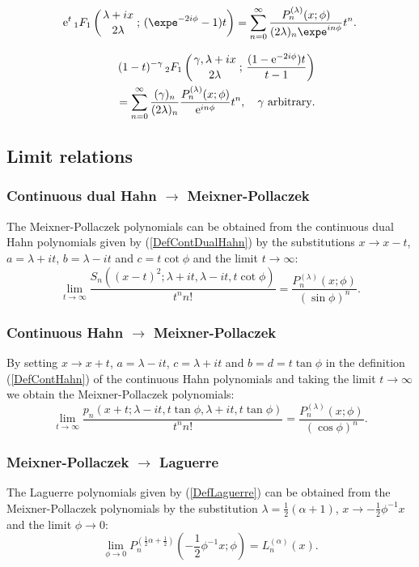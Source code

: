 \documentclass[envcountchap,graybox]{svmono}
\newcounter{rom}
\newcommand{\hyp}[5]{\mbox{}_{#1}{F}_{#2}
\left(\genfrac{}{}{0pt}{}{#3}{#4}\,;\,#5\right)}
\newcommand{\e}{\textrm{e}}
\begin{document}
\begin{equation}
\label{GenMP2}
\e^t\,\hyp{1}{1}{\lambda+ix}{2\lambda}{(\expe^{-2i\phi}-1)t}=
\sum_{n=0}^{\infty}\frac{P_n^{(\lambda)}(x;\phi)}{(2\lambda)_n\expe^{in\phi}}t^n.
\end{equation}

\begin{eqnarray}
\label{GenMP3}
& &(1-t)^{-\gamma}\,\hyp{2}{1}{\gamma,\lambda+ix}{2\lambda}{\frac{(1-\e^{-2i\phi})t}{t-1}}\nonumber\\
& &{}=\sum_{n=0}^{\infty}\frac{(\gamma)_n}{(2\lambda)_n}\frac{P_n^{(\lambda)}(x;\phi)}{\e^{in\phi}}t^n,
\quad\textrm{$\gamma$ arbitrary}.
\end{eqnarray}

\subsection*{Limit relations}

\subsubsection*{Continuous dual Hahn $\rightarrow$ Meixner-Pollaczek}
The Meixner-Pollaczek polynomials can be obtained from the continuous dual Hahn polynomials
given by (\ref{DefContDualHahn}) by the substitutions $x\rightarrow x-t$, $a=\lambda+it$,
$b=\lambda-it$ and $c=t\cot\phi$ and the limit $t\rightarrow\infty$:
$$\lim_{t\rightarrow\infty}\frac{S_n((x-t)^2;\lambda+it,\lambda-it,t\cot\phi)}{t^nn!}
=\frac{P_n^{(\lambda)}(x;\phi)}{(\sin\phi)^n}.$$

\subsubsection*{Continuous Hahn $\rightarrow$ Meixner-Pollaczek}
By setting $x\rightarrow x+t$, $a=\lambda-it$, $c=\lambda+it$ and $b=d=t\tan\phi$ in the
definition (\ref{DefContHahn}) of the continuous Hahn polynomials and taking the limit
$t\rightarrow\infty$ we obtain the Meixner-Pollaczek polynomials:
$$\lim_{t\rightarrow\infty}\frac{p_n(x+t;\lambda-it,t\tan\phi,\lambda+it,t\tan\phi)}{t^nn!}
=\frac{P_n^{(\lambda)}(x;\phi)}{(\cos\phi)^n}.$$

\newpage

\subsubsection*{Meixner-Pollaczek $\rightarrow$ Laguerre}
The Laguerre polynomials given by (\ref{DefLaguerre}) can be obtained from the
Meixner-Pollaczek polynomials by the substitution $\lambda=\frac{1}{2}(\alpha+1)$,
$x\rightarrow -\frac{1}{2}\phi^{-1}x$ and the limit $\phi\rightarrow 0$:
\begin{equation}
\lim_{\phi\rightarrow 0}
P_n^{(\frac{1}{2}\alpha+\frac{1}{2})}(-\textstyle\frac{1}{2}\phi^{-1}x;\phi)=L_n^{(\alpha)}(x).
\end{equation}
\end{document}
